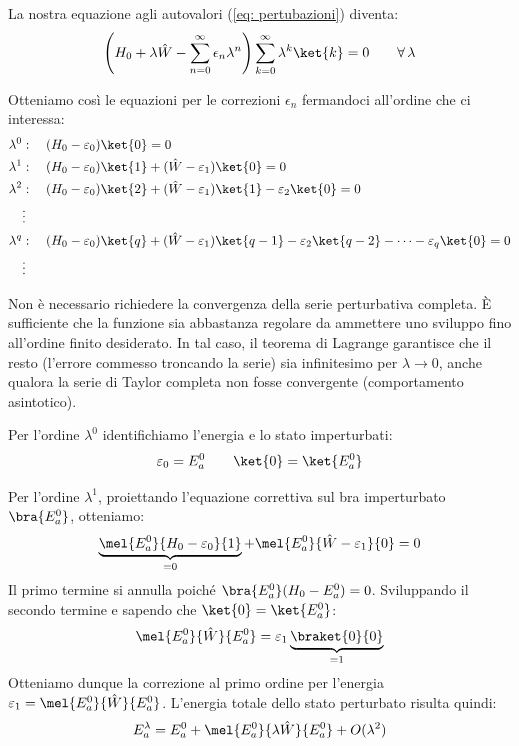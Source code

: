 La nostra equazione agli autovalori (\ref{eq: pertubazioni}) diventa:
\begin{equation}
    \left(H_0+ \lambda\hat{W}- \sum_{n=0}^{\infty}\epsilon_n\lambda^n\right)\sum_{k=0}^{\infty}\lambda^k\ket{k}=0 \qquad \forall \,\lambda
\end{equation}

Otteniamo così le equazioni per le correzioni \(\epsilon_n\) fermandoci all'ordine che ci interessa:
\begin{align*}
    \lambda^0 &: \quad (H_0 - \varepsilon_0) \ket{0} = 0 \\
    \lambda^1 &: \quad (H_0 - \varepsilon_0) \ket{1} + (\hat{W} - \varepsilon_1) \ket{0} = 0 \\
    \lambda^2 &: \quad (H_0 - \varepsilon_0) \ket{2} + (\hat{W} - \varepsilon_1) \ket{1} - \varepsilon_2 \ket{0} = 0 \\
    &\vdots \\
    \lambda^q &: \quad (H_0 - \varepsilon_0) \ket{q} + (\hat{W} - \varepsilon_1) \ket{q-1} - \varepsilon_2 \ket{q-2} - \dots - \varepsilon_q \ket{0} = 0 \\
    &\vdots
\end{align*}



\begin{remark}
    Non è necessario richiedere la convergenza della serie perturbativa completa. 
    È sufficiente che la funzione sia abbastanza regolare da ammettere uno sviluppo fino all'ordine finito desiderato. 
    In tal caso, il teorema di Lagrange garantisce che il resto (l'errore commesso troncando la serie) sia infinitesimo per \(\lambda \to 0\), 
    anche qualora la serie di Taylor completa non fosse convergente (comportamento asintotico).
\end{remark}

Per l'ordine \(\lambda^0\) identifichiamo l'energia e lo stato imperturbati:
\[
    \varepsilon_0 = E_a^0 \qquad \ket{0} = \ket{E_a^0}
\]

Per l'ordine \(\lambda^1\), proiettando l'equazione correttiva sul bra imperturbato \(\bra{E_a^0}\), otteniamo:
\[
    \underbrace{\mel{E_a^0}{H_0 - \varepsilon_0}{1}}_{=0} + \mel{E_a^0}{\hat{W} - \varepsilon_1}{0} = 0
\]
Il primo termine si annulla poiché \(\bra{E_a^0}(H_0 - E_a^0) = 0\). Sviluppando il secondo termine e sapendo che \(\ket{0}=\ket{E_a^0}\):
\[
    \mel{E_a^0}{\hat{W}}{E_a^0} = \varepsilon_1 \underbrace{\braket{0}{0}}_{=1}
\]
Otteniamo dunque la correzione al primo ordine per l'energia \(\varepsilon_1 = \mel{E_a^0}{\hat{W}}{E_a^0}\).
L'energia totale dello stato perturbato risulta quindi:
\[
    E_a^\lambda = E_a^0 + \mel{E_a^0}{\lambda \hat{W}}{E_a^0} + O(\lambda^2)
\]


